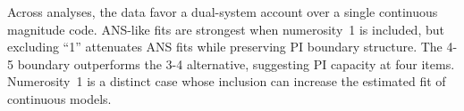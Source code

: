 Across analyses, the data favor a dual-system account over a single
continuous magnitude code. ANS-like fits are strongest when numerosity~1
is included, but excluding ``1'' attenuates ANS fits while preserving PI
boundary structure. The 4-5 boundary outperforms the 3-4 alternative,
suggesting PI capacity at four items. Numerosity~1 is a distinct case
whose inclusion can increase the estimated fit of continuous models.
